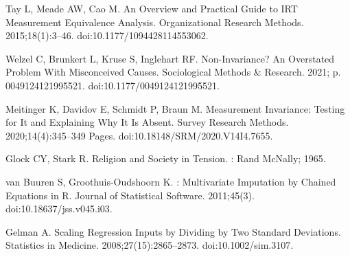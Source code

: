 \documentclass[10pt,letterpaper]{article}
\begin{document}
\begin{thebibliography}{10}
Tay L, Meade AW, Cao M.
\newblock An {{Overview}} and {{Practical Guide}} to {{IRT Measurement
  Equivalence Analysis}}.
\newblock Organizational Research Methods. 2015;18(1):3--46.
\newblock doi:{10.1177/1094428114553062}.

Welzel C, Brunkert L, Kruse S, Inglehart RF.
\newblock Non-Invariance? {{An Overstated Problem With Misconceived Causes}}.
\newblock Sociological Methods \& Research. 2021; p. 0049124121995521.
\newblock doi:{10.1177/0049124121995521}.

Meitinger K, Davidov E, Schmidt P, Braun M.
\newblock Measurement {{Invariance}}: {{Testing}} for {{It}} and {{Explaining
  Why It}} Is {{Absent}}.
\newblock Survey Research Methods. 2020;14(4):345--349 Pages.
\newblock doi:{10.18148/SRM/2020.V14I4.7655}.

Glock CY, Stark R.
\newblock Religion and {{Society}} in {{Tension}}.
: {Rand McNally}; 1965.

van Buuren S, {Groothuis-Oudshoorn} K.
 : {{Multivariate Imputation}} by {{Chained Equations}} in
  {{R}}.
\newblock Journal of Statistical Software. 2011;45(3).
\newblock doi:{10.18637/jss.v045.i03}.

Gelman A.
\newblock Scaling {{Regression Inputs}} by {{Dividing}} by {{Two Standard
  Deviations}}.
\newblock Statistics in Medicine. 2008;27(15):2865--2873.
\newblock doi:{10.1002/sim.3107}.

\end{thebibliography}
\end{document}
